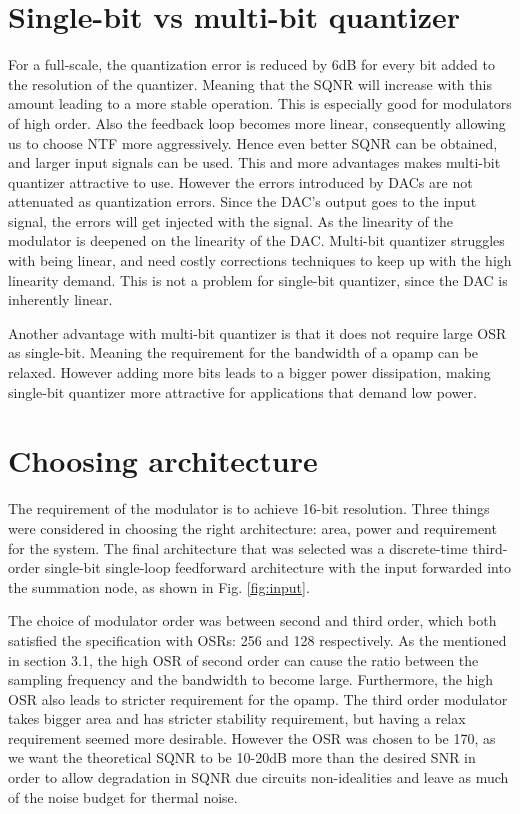 \section{Single-bit vs multi-bit quantizer}
For a full-scale, the quantization error is reduced by 6dB for every bit added to the resolution of the quantizer\cite[Ch.6]{Richard}. Meaning that the SQNR will increase with this amount leading to a more stable operation. This is especially good for modulators of high order. Also the feedback loop becomes more linear, consequently allowing us to choose NTF more aggressively. Hence even better SQNR can be obtained, and larger input signals can be used. This and more advantages makes multi-bit quantizer attractive to use. However the errors introduced by DACs are not attenuated as quantization errors. Since the DAC's output goes to the input signal, the errors will get injected with the signal. As the linearity of the modulator is deepened on the linearity of the DAC. Multi-bit quantizer struggles with being linear, and need costly corrections techniques to keep up with the high linearity demand. This is not a problem for single-bit quantizer, since the DAC is inherently linear.

Another advantage with multi-bit quantizer is that it does not require large OSR as single-bit. Meaning the requirement for the bandwidth of a opamp can be relaxed. However adding more bits leads to a bigger power dissipation, making single-bit quantizer more attractive for applications that demand low power.

\section{Choosing architecture}
The requirement of the modulator is to achieve 16-bit resolution. Three things were considered in choosing the right architecture: area, power and requirement for the system. The final architecture that was selected was a discrete-time third-order single-bit single-loop feedforward architecture with the input forwarded into the summation node, as shown in Fig. \ref{fig:input}.

The choice of modulator order was between second and third order, which both satisfied the specification with OSRs: 256 and 128 respectively. As the mentioned in section 3.1, the high OSR of second order can cause the ratio between the sampling frequency and the bandwidth to become large. Furthermore, the high OSR also leads to stricter requirement for the opamp. The third order modulator takes bigger area and has stricter stability requirement, but having a relax requirement seemed more desirable. However the OSR was chosen to be 170, as we want the theoretical SQNR to be 10-20dB more than the desired SNR in order to allow degradation in SQNR due circuits non-idealities and leave as much of the noise budget for thermal noise\cite[Ch.9.2]{Richard}.

